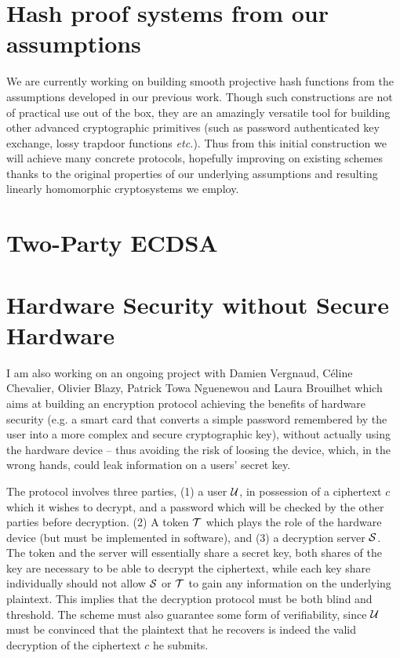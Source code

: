\documentclass[11pt]{llncs}
\begin{document}
\section{Hash proof systems from our assumptions}
We are currently working on building smooth projective hash functions from the assumptions developed in our previous work. Though such constructions are not of practical use out of the box, they are an amazingly versatile tool for building other advanced cryptographic primitives (such as password authenticated key exchange, lossy trapdoor functions \textit{etc.}). Thus from this initial construction we will achieve many concrete protocols, hopefully improving on existing schemes thanks to the original properties of our underlying assumptions and resulting linearly homomorphic cryptosystems we employ.

\section{Two-Party ECDSA}

\section{}
\section{Hardware Security without Secure Hardware} 
I am also working on an ongoing project with Damien Vergnaud, Céline Chevalier, Olivier Blazy, Patrick Towa Nguenewou and Laura Brouilhet which aims at building an encryption protocol achieving the benefits of hardware security (e.g. a smart card that converts a simple password remembered by the user into a more complex and secure cryptographic key), without actually using the hardware device -- thus avoiding the risk of loosing the device, which, in the wrong hands, could leak information on a users' secret key.

The protocol involves three parties, (1) a user $\mathcal{U}$, in possession of a ciphertext $c$ which it wishes to decrypt, and a password which will be checked by the other parties before decryption. (2) A token $\mathcal{T}$ which plays the role of the hardware device (but must be implemented in software), and (3) a decryption server $\mathcal{S}$. The token and the server will essentially share a secret key, both shares of the key are necessary to be able to decrypt the ciphertext, while each key share individually should not allow $\mathcal{S}$ or $\mathcal{T}$ to gain any information on the underlying plaintext. This implies that the decryption protocol must be both blind and threshold. The scheme must also guarantee some form of verifiability, since $\mathcal{U}$ must be convinced that the plaintext that he recovers is indeed the valid decryption of the ciphertext $c$ he submits.
\end{document}
